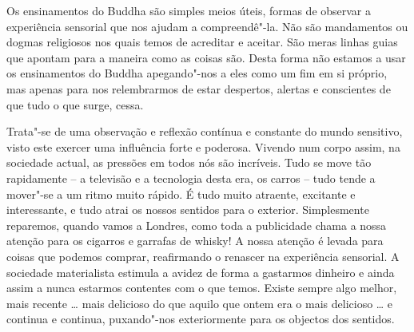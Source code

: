 Os ensinamentos do Buddha são simples meios úteis, formas de observar a
experiência sensorial que nos ajudam a compreendê"-la. Não são
mandamentos ou dogmas religiosos nos quais temos de acreditar e aceitar.
São meras linhas guias que apontam para a maneira como as coisas são.
Desta forma não estamos a usar os ensinamentos do Buddha apegando"-nos a
eles como um fim em si próprio, mas apenas para nos relembrarmos de
estar despertos, alertas e conscientes de que tudo o que surge, cessa.

Trata"-se de uma observação e reflexão contínua e constante do mundo
sensitivo, visto este exercer uma influência forte e poderosa. Vivendo
num corpo assim, na sociedade actual, as pressões em todos nós são
incríveis. Tudo se move tão rapidamente -- a televisão e a tecnologia
desta era, os carros -- tudo tende a mover"-se a um ritmo muito rápido. É
tudo muito atraente, excitante e interessante, e tudo atrai os nossos
sentidos para o exterior. Simplesmente reparemos, quando vamos a
Londres, como toda a publicidade chama a nossa atenção para os cigarros
e garrafas de whisky! A nossa atenção é levada para coisas que podemos
comprar, reafirmando o renascer na experiência sensorial. A sociedade
materialista estimula a avidez de forma a gastarmos dinheiro e ainda
assim a nunca estarmos contentes com o que temos. Existe sempre algo
melhor, mais recente \ldots{} mais delicioso do que aquilo que ontem era
o mais delicioso \ldots{} e continua e continua, puxando"-nos
exteriormente para os objectos dos sentidos.

